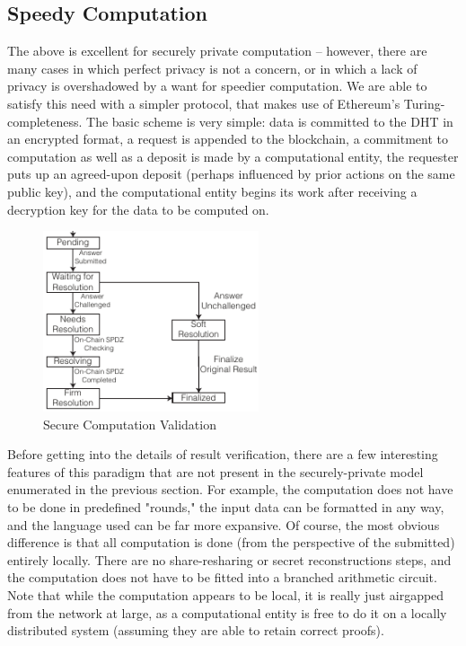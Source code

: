 \documentclass[journal,11pt]{IEEEtran}
\begin{document}
\subsection{Speedy Computation}
\par The above is excellent for securely private computation -- however, there are many cases in which perfect privacy is not a concern, or in which a lack of privacy is overshadowed by a want for speedier computation. We are able to satisfy this need with a simpler protocol, that makes use of Ethereum's Turing-completeness. The basic scheme is very simple: data is committed to the DHT in an encrypted format, a request is appended to the blockchain, a commitment to computation as well as a deposit is made by a computational entity, the requester puts up an agreed-upon deposit (perhaps influenced by prior actions on the same public key), and the computational entity begins its work after receiving a decryption key for the data to be computed on.
\begin{figure}
  \centering
  \includegraphics[width=2.5in]{figs/flowchart}
  \caption{Secure Computation Validation}
  \label{validation}
\end{figure}
\par Before getting into the details of result verification, there are a few interesting features of this paradigm that are not present in the securely-private model enumerated in the previous section. For example, the computation does not have to be done in predefined "rounds," the input data can be formatted in any way, and the language used can be far more expansive. Of course, the most obvious difference is that all computation is done (from the perspective of the submitted) entirely locally. There are no share-resharing or secret reconstructions steps, and the computation does not have to be fitted into a branched arithmetic circuit. Note that while the computation appears to be local, it is really just airgapped from the network at large, as a computational entity is free to do it on a locally distributed system (assuming they are able to retain correct proofs).
\end{document}
